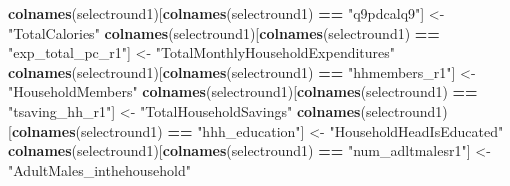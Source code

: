 \documentclass[
]{article}
\newenvironment{Shaded}{\begin{snugshade}}{\end{snugshade}}
\newcommand{\FunctionTok}[1]{\textcolor[rgb]{0.13,0.29,0.53}{\textbf{#1}}}
\newcommand{\NormalTok}[1]{#1}
\newcommand{\OtherTok}[1]{\textcolor[rgb]{0.56,0.35,0.01}{#1}}
\newcommand{\SpecialCharTok}[1]{\textcolor[rgb]{0.81,0.36,0.00}{\textbf{#1}}}
\newcommand{\StringTok}[1]{\textcolor[rgb]{0.31,0.60,0.02}{#1}}
\begin{document}
\begin{Shaded}
\begin{Highlighting}[]
\FunctionTok{colnames}\NormalTok{(selectround1)[}\FunctionTok{colnames}\NormalTok{(selectround1) }\SpecialCharTok{==} \StringTok{"q9pdcalq9"}\NormalTok{] }\OtherTok{\textless{}{-}} \StringTok{"TotalCalories"}
\FunctionTok{colnames}\NormalTok{(selectround1)[}\FunctionTok{colnames}\NormalTok{(selectround1) }\SpecialCharTok{==} \StringTok{"exp\_total\_pc\_r1"}\NormalTok{] }\OtherTok{\textless{}{-}} \StringTok{"TotalMonthlyHouseholdExpenditures"}
\FunctionTok{colnames}\NormalTok{(selectround1)[}\FunctionTok{colnames}\NormalTok{(selectround1) }\SpecialCharTok{==} \StringTok{"hhmembers\_r1"}\NormalTok{] }\OtherTok{\textless{}{-}} \StringTok{"HouseholdMembers"}
\FunctionTok{colnames}\NormalTok{(selectround1)[}\FunctionTok{colnames}\NormalTok{(selectround1) }\SpecialCharTok{==} \StringTok{"tsaving\_hh\_r1"}\NormalTok{] }\OtherTok{\textless{}{-}} \StringTok{"TotalHouseholdSavings"}
\FunctionTok{colnames}\NormalTok{(selectround1)[}\FunctionTok{colnames}\NormalTok{(selectround1) }\SpecialCharTok{==} \StringTok{"hhh\_education"}\NormalTok{] }\OtherTok{\textless{}{-}} \StringTok{"HouseholdHeadIsEducated"}
\FunctionTok{colnames}\NormalTok{(selectround1)[}\FunctionTok{colnames}\NormalTok{(selectround1) }\SpecialCharTok{==} \StringTok{"num\_adltmalesr1"}\NormalTok{] }\OtherTok{\textless{}{-}} \StringTok{"AdultMales\_inthehousehold"}
\end{Highlighting}
\end{Shaded}
\end{document}
